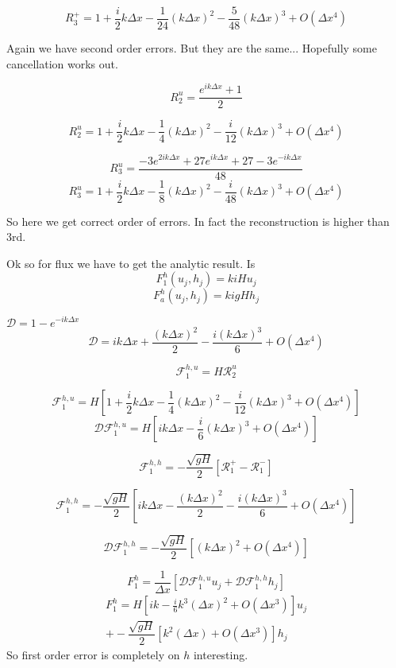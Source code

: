 \documentclass[12pt]{article}
\begin{document}
\[R_3^+= 1 + \frac{i}{2}k\Delta x - \frac{1}{24} (k \Delta x)^2 - \frac{5}{48} (k \Delta x)^3 +  O( \Delta x^4)\] 

Again we have second order errors. But they are the same... Hopefully some cancellation works out.

\[R^u_2 = \frac{e^{ik\Delta x } + 1}{2} \]

\[R^u_2 = 1 + \frac{i}{2}k\Delta x - \frac{1}{4} (k \Delta x)^2 - \frac{i}{12} (k \Delta x)^3 +  O( \Delta x^4)\]

\[R^u_3 = \frac{-3e^{2ik\Delta x } + 27e^{ik\Delta x } + 27 - 3e^{-ik\Delta x }}{48}\]
\[R^u_3 = 1 + \frac{i}{2}k\Delta x - \frac{1}{8} (k \Delta x)^2 - \frac{i}{48} (k \Delta x)^3 +  O( \Delta x^4) \]

So here we get correct order of errors. In fact the reconstruction is higher than 3rd.

Ok so for flux we have to get the analytic result. 
Is
\[F^h_1(u_j,h_j) = kiHu_j\]
\[F^h_a(u_j,h_j) = kigHh_j\]

$\mathcal{D} = 1 -e^{-ik\Delta x}$
\[\mathcal{D} = ik\Delta x +\frac{(k\Delta x)^2}{2} - \frac{i(k\Delta x)^3}{6} +  O( \Delta x^4) \]
%

\[\mathcal{F}^{h,u}_1 = H\mathcal{R}_2^u\]

\[\mathcal{F}^{h,u}_1 = H \left[1 + \frac{i}{2}k\Delta x - \frac{1}{4} (k \Delta x)^2 - \frac{i}{12} (k \Delta x)^3 +  O( \Delta x^4) \right]\]
\[\mathcal{D}\mathcal{F}^{h,u}_1 = H \left[ik\Delta x  - \frac{i}{6} (k \Delta x)^3 +  O( \Delta x^4) \right]\]

\[\mathcal{F}_1^{h,h} = -\dfrac{ \sqrt{gH}}{ 2} \left [ \mathcal{R}_1^+- \mathcal{R}_1^- \right ]\]

\[\mathcal{F}_1^{h,h} = -\dfrac{ \sqrt{gH}}{ 2} \left [ ik\Delta x - \frac{(k\Delta x)^2}{2} - \frac{i(k\Delta x)^3}{6} +  O( \Delta x^4) \right ]\]

\[\mathcal{D}\mathcal{F}_1^{h,h} = -\dfrac{ \sqrt{gH}}{ 2} \left [ (k\Delta x)^2 +  O( \Delta x^4) \right ]\]

\[F^h_1 = \frac{1}{\Delta x} \left[\mathcal{D}\mathcal{F}^{h,u}_1 u_j + \mathcal{D}\mathcal{F}^{h,h}_1 h_j \right]\]
\begin{multline}
F^h_1 =H \left[ik  - \frac{i}{6} k^3( \Delta x)^2 +  O( \Delta x^3) \right]u_j\\ + -\dfrac{ \sqrt{gH}}{ 2} \left [ k^2(\Delta x) +  O( \Delta x^3) \right ]h_j
\end{multline}
So first order error is completely on $h$ interesting. 
\end{document}
